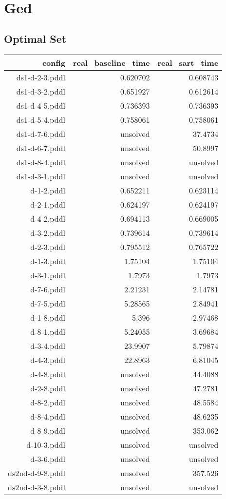 \documentclass{article}
\begin{document}
                \newpage \section{Ged}
                    \subsection*{Optimal Set}
                    
                            \begin{center}
                            \scriptsize
                            \begin{tabular}{r|r|r}
                            config & real\_baseline\_time & real\_sart\_time\\\midrule
                             ds1-d-2-3.pddl&0.620702&0.608743\\
 ds1-d-3-2.pddl&0.651927&0.612614\\
 ds1-d-4-5.pddl&0.736393&0.736393\\
 ds1-d-5-4.pddl&0.758061&0.758061\\
 ds1-d-7-6.pddl&unsolved&37.4734\\
 ds1-d-6-7.pddl&unsolved&50.8997\\
 ds1-d-8-4.pddl&unsolved&unsolved\\
 ds1-d-3-1.pddl&unsolved&unsolved\\
 d-1-2.pddl&0.652211&0.623114\\
 d-2-1.pddl&0.624197&0.624197\\
 d-4-2.pddl&0.694113&0.669005\\
 d-3-2.pddl&0.739614&0.739614\\
 d-2-3.pddl&0.795512&0.765722\\
 d-1-3.pddl&1.75104&1.75104\\
 d-3-1.pddl&1.7973&1.7973\\
 d-7-6.pddl&2.21231&2.14781\\
 d-7-5.pddl&5.28565&2.84941\\
 d-1-8.pddl&5.396&2.97468\\
 d-8-1.pddl&5.24055&3.69684\\
 d-3-4.pddl&23.9907&5.79874\\
 d-4-3.pddl&22.8963&6.81045\\
 d-4-8.pddl&unsolved&44.4088\\
 d-2-8.pddl&unsolved&47.2781\\
 d-8-2.pddl&unsolved&48.5584\\
 d-8-4.pddl&unsolved&48.6235\\
 d-8-9.pddl&unsolved&353.062\\
 d-10-3.pddl&unsolved&unsolved\\
 d-3-6.pddl&unsolved&unsolved\\
 ds2nd-d-9-8.pddl&unsolved&357.526\\
 ds2nd-d-3-8.pddl&unsolved&unsolved
                            \end{tabular}
                            \end{center}
                    
\end{document}
